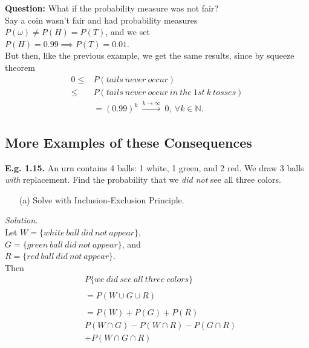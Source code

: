 \documentclass[12pt]{book}
\begin{document}
\newpage
\noindent \textbf{Question: } What if the probability measure was not fair?\\
Say a coin wasn't fair and had probability measures\\
$P(\omega) \neq P(H)=P(T)$, and we set\\
$P(H)=0.99 \implies P(T) = 0.01$.\\
But then, like the previous example, we get the same results, since by squeeze theorem
$$\begin{aligned}
0\leq &P(tails~never~occur) \\\leq 
&P(tails~never~occur~in~the~1st~k~tosses)\\
&=\left(0.99\right)^{k} ~\xrightarrow{k\to \infty}~ 0 
,~\forall k\in \mathbb{N}.
\end{aligned}$$



\subsection{More Examples of these Consequences}
\noindent \textbf{E.g. 1.15.} An urn contains 4 balls: 1 white, 1 green, and 2 red. We draw 3 balls \textit{with} replacement. Find the probability that we \textit{did not} see all three colors.
\begin{itemize}\item[(a)] Solve with Inclusion-Exclusion Principle.\end{itemize}
\textit{Solution.}\\
Let $W = \{white~ball~did~not~appear\}$, \\
$G = \{green~ball~did~not~appear\}$, and \\
$R = \{red~ball~did~not~appear\}$.\\
Then 
\begin{align*}
&P\{we~did~see~all~three~colors\} \\\\
&= P(W \cup G \cup R) \\\\
&=P(W) + P(G) + P(R)\\
&P(W \cap G) -P(W \cap R) -P(G \cap R)\\
&+P(W\cap G\cap R)\\\\
\end{align*}
\end{document}
